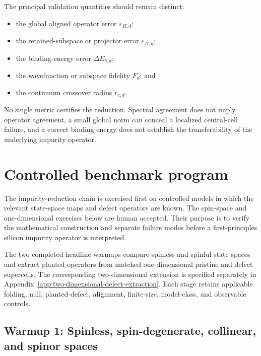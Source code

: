 
The principal validation quantities should remain distinct:
\begin{itemize}
    \item the global aligned operator error $\varepsilon_{H,d}$;
    \item the retained-subspace or projector error $\varepsilon_{\Pi,d}$;
    \item the binding-energy error $\Delta E_{b,d}$;
    \item the wavefunction or subspace fidelity $F_d$; and
    \item the continuum crossover radius $r_{c,d}$.
\end{itemize}
No single metric certifies the reduction. Spectral agreement does not imply
operator agreement, a small global norm can conceal a localized central-cell
failure, and a correct binding energy does not establish the transferability of
the underlying impurity operator.

\section{Controlled benchmark program}

The impurity-reduction chain is exercised first on controlled models in which
the relevant state-space maps and defect operators are known. The spin-space
and one-dimensional exercises below are human accepted. Their purpose is to
verify the mathematical construction and separate failure modes before a
first-principles silicon impurity operator is interpreted.

The two completed headline warmups compare spinless and spinful state spaces
and extract planted operators from matched one-dimensional pristine and defect
supercells. The corresponding two-dimensional extension is specified
separately in Appendix~\ref{app:two-dimensional-defect-extraction}. Each stage
retains applicable folding, null, planted-defect, alignment, finite-size,
model-class, and observable controls.

\subsection{Warmup 1: Spinless, spin-degenerate, collinear, and spinor spaces}

